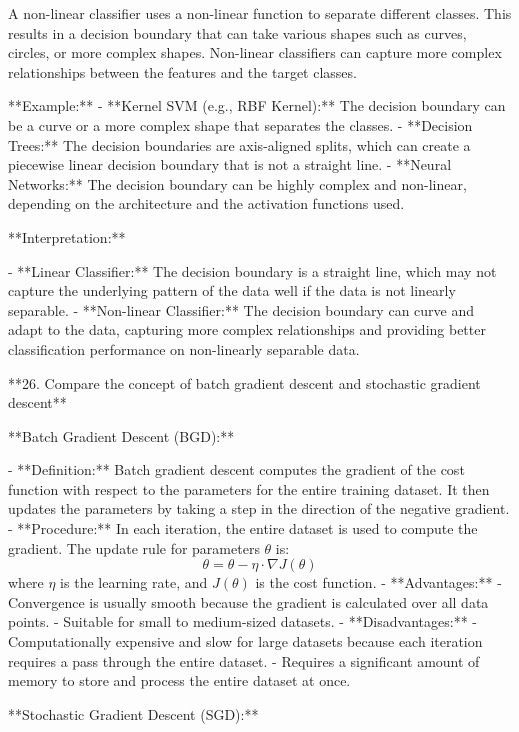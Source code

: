 A non-linear classifier uses a non-linear function to separate different classes. This results in a decision boundary that can take various shapes such as curves, circles, or more complex shapes. Non-linear classifiers can capture more complex relationships between the features and the target classes.

**Example:**
- **Kernel SVM (e.g., RBF Kernel):** The decision boundary can be a curve or a more complex shape that separates the classes.
- **Decision Trees:** The decision boundaries are axis-aligned splits, which can create a piecewise linear decision boundary that is not a straight line.
- **Neural Networks:** The decision boundary can be highly complex and non-linear, depending on the architecture and the activation functions used.



**Interpretation:**

- **Linear Classifier:** The decision boundary is a straight line, which may not capture the underlying pattern of the data well if the data is not linearly separable.
- **Non-linear Classifier:** The decision boundary can curve and adapt to the data, capturing more complex relationships and providing better classification performance on non-linearly separable data.

**26. Compare the concept of batch gradient descent and stochastic gradient descent**

**Batch Gradient Descent (BGD):**

- **Definition:** Batch gradient descent computes the gradient of the cost function with respect to the parameters for the entire training dataset. It then updates the parameters by taking a step in the direction of the negative gradient.
- **Procedure:** In each iteration, the entire dataset is used to compute the gradient. The update rule for parameters \( \theta \) is:
  \[ \theta = \theta - \eta \cdot \nabla J(\theta) \]
  where \( \eta \) is the learning rate, and \( J(\theta) \) is the cost function.
- **Advantages:**
  - Convergence is usually smooth because the gradient is calculated over all data points.
  - Suitable for small to medium-sized datasets.
- **Disadvantages:**
  - Computationally expensive and slow for large datasets because each iteration requires a pass through the entire dataset.
  - Requires a significant amount of memory to store and process the entire dataset at once.

**Stochastic Gradient Descent (SGD):**

